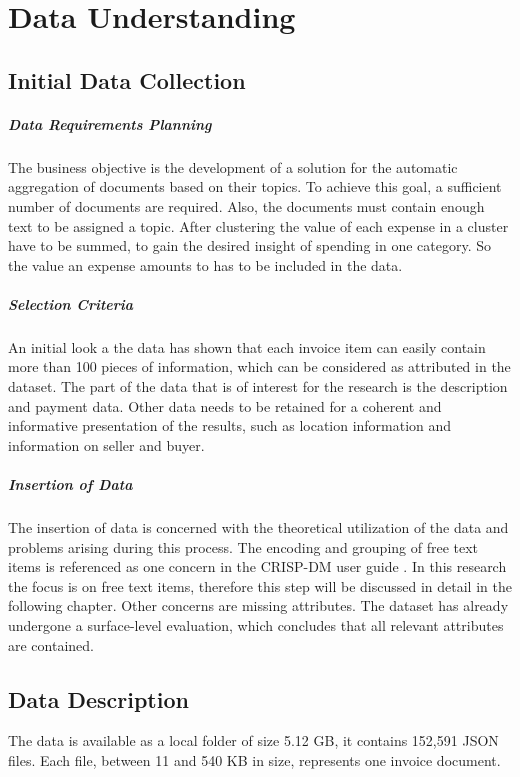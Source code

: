 \chapter{Data Understanding}

\section{Initial Data Collection}

\paragraph{Data Requirements Planning}
The business objective is the development of a solution for the automatic aggregation of documents based on their topics. To achieve this goal, a sufficient number of documents are required. Also, the documents must contain enough text to be assigned a topic. After clustering the value of each expense in a cluster have to be summed, to gain the desired insight of spending in one category. So the value an expense amounts to has to be included in the data.

\paragraph{Selection Criteria}
An initial look a the data has shown that each invoice item can easily contain more than 100 pieces of information, which can be considered as attributed in the dataset. The part of the data that is of interest for the research is the description and payment data. Other data needs to be retained for a coherent and informative presentation of the results, such as location information and information on seller and buyer.

\paragraph{Insertion of Data}
The insertion of data is concerned with the theoretical utilization of the data and problems arising during this process. The encoding and grouping of free text items is referenced as one concern in the \ac{CRISP-DM} user guide \cite[p.~38]{CRISPDM2000}. In this research the focus is on free text items, therefore this step will be discussed in detail in the following chapter. 
Other concerns are missing attributes. The dataset has already undergone a surface-level evaluation, which concludes that all relevant attributes are contained.

\section{Data Description}
The data is available as a local folder of size 5.12 GB, it contains 152,591 \ac{JSON} files. Each file, between 11 and 540 KB in size, represents one invoice document. 

